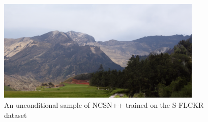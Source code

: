 %
\begin{figure} \label{fig:5.15}
    \centering
    \includegraphics[width=0.87\textwidth]{Chapters/figures/appendix/flickr/7_uncond_sample.png}
    \caption{An unconditional sample of NCSN++ trained on the S-FLCKR dataset}
\end{figure}

